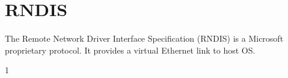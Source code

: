\documentclass[mscthesis]{usiinfthesis}
\begin{document}
\section{RNDIS}\label{sec:RNDIS}
\paragraph{}
The Remote Network Driver Interface Specification (RNDIS) is a Microsoft proprietary protocol. It provides a virtual Ethernet link to host OS.

%
%



1
\end{document}
